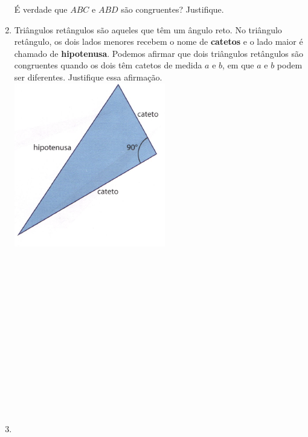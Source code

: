\documentclass[a4paper,14pt]{article}
\begin{document}
\begin{multicols}{2}
\begin{enumerate}
			É verdade que $ABC$ e $ABD$ são congruentes? Justifique. \newpage
			\item Triângulos retângulos são aqueles que têm um ângulo reto. No triângulo retângulo, os dois lados menores recebem o nome de \textbf{catetos} e o lado maior é chamado de \textbf{hipotenusa}. Podemos afirmar que dois triângulos retângulos são congruentes quando os dois têm catetos de medida $a$ e $b$, em que $a$ e $b$ podem ser diferentes. Justifique essa afirmação. \\
			\includegraphics[width=1\linewidth]{6FMA123_imagens/imagem5}
			\\\\\\\\\\\\\\\\\\\\\\\\\\\\\\
			\item \begin{enumerate}[a)]

\end{enumerate}
\end{enumerate}
\end{multicols}
\end{document}
